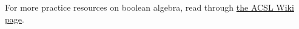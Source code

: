 \documentclass[10pt]{article}
\begin{document}
For more practice resources on boolean algebra, read through
\href{http://www.categories.acsl.org/wiki/index.php?title=Boolean_Algebra}{the ACSL Wiki page}.
\end{document}
